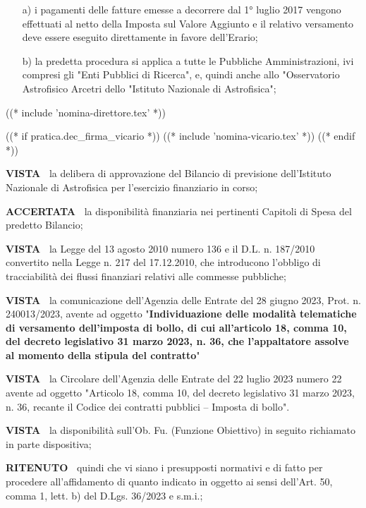 \begin{enumerate}

\item[a)] i pagamenti delle fatture
emesse a decorrere dal 1° luglio 2017 vengono effettuati al netto della
Imposta sul Valore Aggiunto e il relativo versamento deve essere eseguito
direttamente in favore dell'Erario;

\item[b)] la predetta procedura si
applica a tutte le Pubbliche Amministrazioni, ivi compresi gli "Enti
Pubblici di Ricerca", e, quindi anche allo "Osservatorio Astrofisico
Arcetri dello "Istituto Nazionale di Astrofisica";
\end{enumerate}

((* include 'nomina-direttore.tex' *))

((* if pratica.dec_firma_vicario *))
((* include 'nomina-vicario.tex' *))
((* endif *))

\textbf{VISTA~}	la delibera di approvazione del Bilancio di previsione
dell'Istituto Nazionale di Astrofisica per l'esercizio finanziario
 in corso;

\textbf{ACCERTATA~}	la disponibilità finanziaria nei pertinenti
Capitoli di Spesa del predetto Bilancio;

\textbf{VISTA~}	la Legge del 13 agosto 2010 numero 136	e il
D.L. n. 187/2010 convertito nella Legge n. 217 del 17.12.2010, che
introducono l'obbligo di tracciabilità dei flussi finanziari relativi
alle commesse pubbliche;

\textbf{VISTA~}	la comunicazione dell'Agenzia delle Entrate del 28
giugno 2023,  Prot. n. 240013/2023,  avente ad oggetto	"\textbf{Individuazione
delle modalità telematiche di versamento dell'imposta di bollo, di cui
all'articolo 18, comma 10, del decreto legislativo 31 marzo 2023, n. 36,
che l'appaltatore assolve al momento della stipula del contratto}"

\textbf{VISTA~}	la Circolare dell'Agenzia delle Entrate del 22 luglio
2023 numero 22 avente ad oggetto "Articolo 18, comma 10, del decreto
legislativo 31 marzo 2023, n. 36, recante il Codice dei contratti pubblici
– Imposta di bollo".

\textbf{VISTA~}	la disponibilità sull'Ob. Fu. (Funzione Obiettivo)
in seguito richiamato in parte dispositiva;

\textbf{RITENUTO~} quindi che vi siano i presupposti normativi e
di fatto per procedere all'affidamento di quanto indicato in oggetto
ai sensi dell'Art. 50, comma 1, lett. b) del D.Lgs. 36/2023 e s.m.i.;

